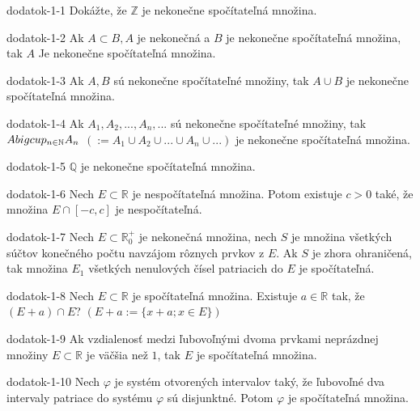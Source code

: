 \begin{defproblem}{dodatok-1-1}
Dokážte, že $\mathbb{Z}$ je nekonečne spočítateľná množina.
\end{defproblem}

\begin{defproblem}{dodatok-1-2}
Ak $A\subset B,A$ je nekonečná a $B$ je nekonečne spočítateľná množina, tak $A$ Je nekonečne spočítateľná množina.
\end{defproblem}

\begin{defproblem}{dodatok-1-3}
Ak $A,B$ sú nekonečne spočítateľné množiny, tak $A\cup B$ je nekonečne spočítateľná množina.
\end{defproblem}

\begin{defproblem}{dodatok-1-4}
Ak $A_1,A_2,...,A_n,...$ sú nekonečne spočítateľné množiny, tak $A\\bigcup_{n\in\mathbb{N}}A_n$ $(:=A_1\cup A_2\cup ...\cup A_n \cup ...)$ je nekonečne spočítateľná množina.
\end{defproblem}

\begin{defproblem}{dodatok-1-5}
$\mathbb{Q}$ je nekonečne spočítateľná množina.
\end{defproblem}

\begin{defproblem}{dodatok-1-6}
Nech $E\subset\mathbb{R}$ je nespočítateľná množina. Potom existuje $c>0$ také, že množina $E\cap [-c,c]$ je nespočítateľná.
\end{defproblem}

\begin{defproblem}{dodatok-1-7}
Nech $E\subset\mathbb{R}_0^+$ je nekonečná množina, nech $S$ je množina všetkých súčtov konečného počtu navzájom rôznych prvkov z $E$. Ak $S$ je zhora ohraničená, tak množina $E_1$ všetkých nenulových čísel patriacich do $E$ je spočítateľná.
\end{defproblem}

\begin{defproblem}{dodatok-1-8}
Nech $E\subset\mathbb{R}$ je spočítateľná množina. Existuje $a\in\mathbb{R}$ tak, že $(E+a)\cap E$? $(E+a:=\{x+a;x\in E\})$
\end{defproblem}

\begin{defproblem}{dodatok-1-9}
Ak vzdialenosť medzi ľubovoľnými dvoma prvkami neprázdnej množiny $E\subset\mathbb{R}$ je väčšia než $1$, tak $E$ je spočítateľná množina.
\end{defproblem}

\begin{defproblem}{dodatok-1-10}
Nech $\varphi$ je systém otvorených intervalov taký, že ľubovoľné dva intervaly patriace do systému $\varphi$ sú disjunktné. Potom $\varphi$ je spočítateľná množina.
\end{defproblem}